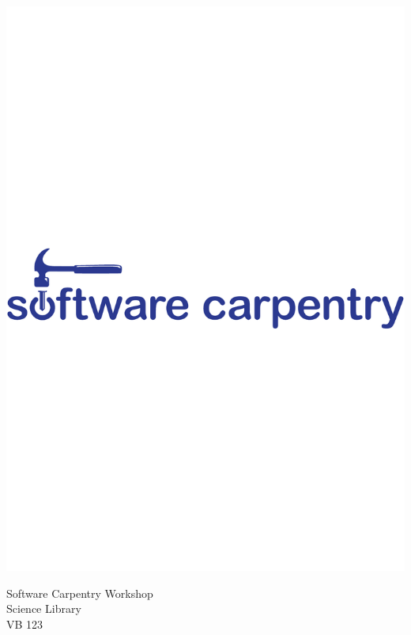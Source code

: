 \documentclass[landscape, a4paper]{article}
\begin{document}
\begin{minipage}{\linewidth}
	\vspace{-2cm}
	
	\hspace{-3cm}\includegraphics[width=1.5\linewidth]{logo_blue.pdf}
\end{minipage}
\vspace{3cm}
\begin{center}
\Huge
Software Carpentry Workshop \\
Science Library \\
\vspace{1cm}
VB 123
\end{center}
\end{document}
